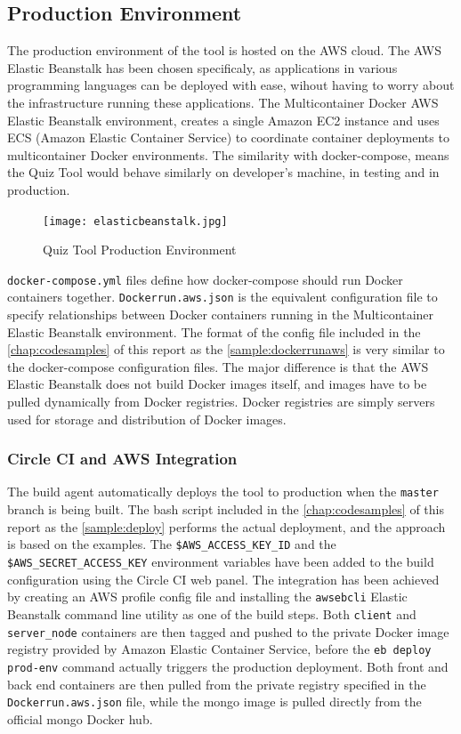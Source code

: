 \subsection{Production Environment}
\label{subsection:productionenv}
The production environment of the tool is hosted on the AWS cloud. The AWS Elastic Beanstalk
has been chosen specificaly, as applications in
various programming languages can be deployed with ease, wihout having to worry about
the infrastructure running these applications\cite{37}. The Multicontainer Docker AWS Elastic
Beanstalk\cite{38} environment, creates a single Amazon EC2\cite{39}
instance and uses ECS (Amazon Elastic Container Service)\cite{40} to coordinate container deployments to
multicontainer Docker environments. The similarity with docker-compose, means the Quiz Tool
would behave similarly on developer's machine, in testing and in production.

\begin{figure}[h!]
    \centering
    \texttt{[image: elasticbeanstalk.jpg]}
    \caption{Quiz Tool Production Environment}
    \label{fig:ebs}
\end{figure}

\texttt{docker-compose.yml} files define how docker-compose should run Docker containers together.
\texttt{Dockerrun.aws.json} is the equivalent configuration file to specify relationships between Docker
containers running in the Multicontainer Elastic Beanstalk environment. The format of the config file
included in the \autoref{chap:codesamples} of this report
as the \autoref{sample:dockerrunaws} is very
similar to the docker-compose configuration files. The major
difference is that the AWS Elastic Beanstalk does not build Docker images itself, and images have
to be pulled dynamically from Docker registries. Docker registries are simply servers used for storage and
distribution of Docker images.

\subsubsection{Circle CI and AWS Integration}
The build agent automatically deploys the tool to production when the \texttt{master}
branch is being built. The bash script included in the \autoref{chap:codesamples} of this report
as the \autoref{sample:deploy} performs the actual deployment, and the
approach is based on the examples\cite{41}\cite{42}.
The \texttt{\$AWS\_ACCESS\_KEY\_ID} and the \texttt{\$AWS\_SECRET\_ACCESS\_KEY} environment
variables have been added to the build configuration using the Circle CI web panel.
The integration has been achieved by creating an AWS profile config file and installing
the \texttt{awsebcli} Elastic Beanstalk command line utility as one of the build steps.
Both \texttt{client} and \texttt{server\_node} containers are then tagged and pushed
to the private Docker image registry provided by Amazon Elastic Container Service, before
the \texttt{eb deploy prod-env} command actually triggers the production deployment.
Both front and back end containers are then pulled from the private registry specified
in the \texttt{Dockerrun.aws.json} file, while the mongo image is pulled directly from
the official mongo Docker hub.

